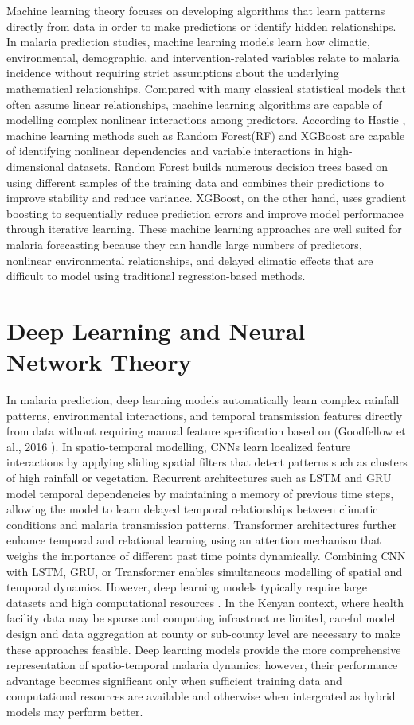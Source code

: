 Machine learning theory focuses on developing algorithms that learn patterns directly from data in order to make predictions or identify hidden relationships. In malaria prediction studies, machine learning models learn how climatic, environmental, demographic, and intervention-related variables relate to malaria incidence without requiring strict assumptions about the underlying mathematical relationships. Compared with many classical statistical models that often assume linear relationships, machine learning algorithms are capable of modelling complex nonlinear interactions among predictors. 
According to Hastie \cite{Hastie2009}, machine learning methods such as Random Forest(RF) and XGBoost are capable of identifying nonlinear dependencies and variable interactions in high-dimensional datasets. Random Forest builds numerous decision trees based on using different samples of the training data and combines their predictions to improve stability and reduce variance. XGBoost, on the other hand, uses gradient boosting to sequentially reduce prediction errors and improve model performance through iterative learning. These machine learning approaches are well suited for malaria forecasting because they can handle large numbers of predictors, nonlinear environmental relationships, and delayed climatic effects that are difficult to model using traditional regression-based methods.

\section{Deep Learning and Neural Network Theory}

In malaria prediction, deep learning models automatically learn complex rainfall patterns, environmental interactions, and temporal transmission features directly from data without requiring manual feature specification based  on (Goodfellow et al., 2016 \cite{Goodfellow-et-al-2016}). In spatio-temporal modelling, CNNs learn localized feature interactions by applying sliding spatial filters that detect patterns such as clusters of high rainfall or vegetation. Recurrent architectures such as LSTM and GRU model temporal dependencies by maintaining a memory of previous time steps, allowing the model to learn delayed temporal relationships between climatic conditions and malaria transmission patterns. Transformer architectures further enhance temporal and relational learning using an attention mechanism that weighs the importance of different past time points dynamically. Combining CNN with LSTM, GRU, or Transformer enables simultaneous modelling of spatial and temporal dynamics. However, deep learning models typically require large datasets and high computational resources \cite{Goodfellow-et-al-2016}. In the Kenyan context, where health facility data may be sparse and computing infrastructure limited, careful model design and data aggregation  at county or sub-county level are necessary to make these approaches feasible. Deep learning models provide the more comprehensive representation of spatio-temporal  malaria dynamics; however, their performance advantage becomes significant only when sufficient training data and computational resources are available and otherwise when intergrated as hybrid  models may perform better.
